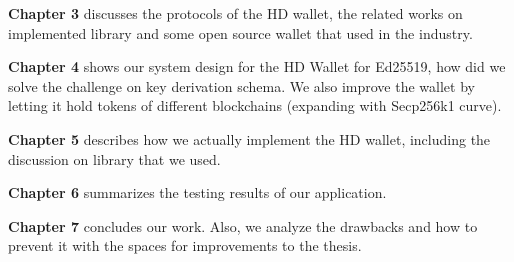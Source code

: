 \textbf{Chapter 3} discusses the protocols of the HD wallet, the related works on implemented library and some open source wallet that used in the industry. 

\textbf{Chapter 4} shows our system design for the HD Wallet for Ed25519, how did we solve the challenge on key derivation schema. We also improve the wallet by letting it hold tokens of different blockchains (expanding with Secp256k1 curve).

\textbf{Chapter 5} describes how we actually implement the HD wallet, including the discussion on library that we used.

\textbf{Chapter 6} summarizes the testing results of our application.

\textbf{Chapter 7} concludes our work. Also, we analyze the drawbacks and how to prevent it with the spaces for improvements to the thesis.
